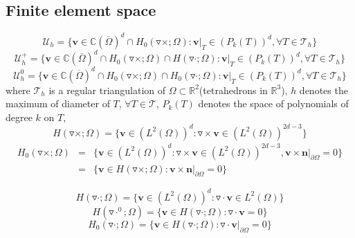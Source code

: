 \documentclass[a4paper,11pt]{article}
\begin{document}
\subsection{Finite element space}
\begin{equation}\label{space:U_h}
\mathcal{U}_h = \{\mathbf{v}\in\mathbb{C}(\overline{\Omega})^d\cap H_0(\triangledown\times;\Omega): \mathbf{v}|_{T}\in(P_k(T))^d,\forall T\in\mathcal{T}_h\}
\end{equation}
\begin{equation}\label{space:U_h_+}
\mathcal{U}_{h}^{+} = \{\mathbf{v}\in\mathbb{C}(\overline{\Omega})^d\cap H_0(\triangledown\times;\Omega)\cap H(\triangledown\cdot;\Omega): \mathbf{v}|_{T}\in(P_k(T))^d,\forall T\in\mathcal{T}_h\}
\end{equation}
\begin{equation}\label{space:U_h_0}
\mathcal{U}_{h}^{0} = \{\mathbf{v}\in\mathbb{C}(\overline{\Omega})^d\cap H_0(\triangledown\times;\Omega)\cap H_0(\triangledown\cdot;\Omega): \mathbf{v}|_{T}\in(P_k(T))^d,\forall T\in\mathcal{T}_h\}
\end{equation}
where \newline\indent\indent$\mathcal{T}_h$ is a regular triangulation of $\Omega\subset\mathbb{R}^2$(tetrahedrons in $\mathbb{R}^3$),\newline
\indent\indent $h$ denotes the maximum of diameter of $T$, $\forall T\in\mathcal{T}$,\newline
\indent\indent $P_k(T)$ denotes the space of polynomials of degree $k$ on $T$,
\begin{equation}\label{space:curl}
H(\triangledown\times;\Omega) = \{\mathbf{v}\in(L^2(\Omega))^d:  \triangledown\times\mathbf{v}\in(L^2(\Omega))^{2d-3}\}
\end{equation}
\begin{eqnarray}\label{space:curl_0}
\nonumber
H_0(\triangledown\times;\Omega) & = & \{\mathbf{v}\in(L^2(\Omega))^d: \triangledown\times\mathbf{v}\in(L^2(\Omega))^{2d-3},\mathbf{v}\times\mathbf{n}|_{\partial\Omega} = 0\} \\ \nonumber
 & = & \{\mathbf{v}\in H(\triangledown\times;\Omega): \mathbf{v}\times\mathbf{n}|_{\partial\Omega} = 0\}
\end{eqnarray}

\begin{equation}\label{space:div}
H(\triangledown\cdot;\Omega) = \{\mathbf{v}\in(L^2(\Omega))^d:  \triangledown\cdot\mathbf{v}\in L^2(\Omega)\}
\end{equation}
\begin{equation}\label{space:div_0+}
\nonumber
H(\triangledown\cdot^0;\Omega) = \{\mathbf{v}\in H(\triangledown\cdot;\Omega): \triangledown\cdot\mathbf{v} = 0\}
\end{equation}
\begin{equation}\label{space:div_0}
\nonumber
H_0(\triangledown\cdot;\Omega) = \{\mathbf{v}\in H(\triangledown\cdot;\Omega): \triangledown\cdot\mathbf{v}|_{\partial\Omega} = 0\}
\end{equation}
\end{document}
